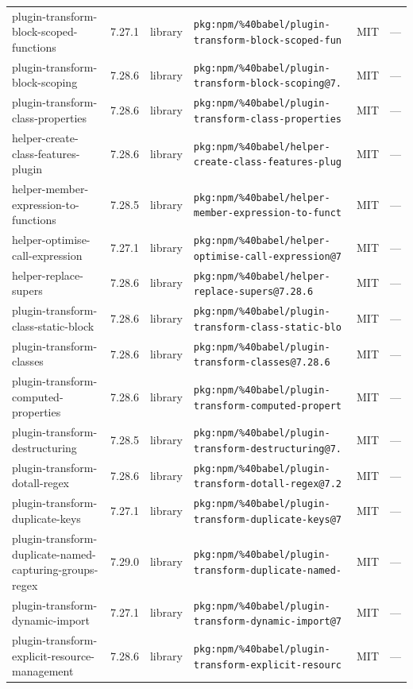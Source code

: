 \documentclass[11pt]{article}
\begin{document}
\begin{longtable}{|l|l|l|p{2.2cm}|l|p{4cm}|}
plugin-transform-block-scoped-functions & 7.27.1 & library & \texttt{pkg:npm/\%40babel/plugin-transform-block-scoped-fun} & MIT & — \\
plugin-transform-block-scoping & 7.28.6 & library & \texttt{pkg:npm/\%40babel/plugin-transform-block-scoping@7.} & MIT & — \\
plugin-transform-class-properties & 7.28.6 & library & \texttt{pkg:npm/\%40babel/plugin-transform-class-properties} & MIT & — \\
helper-create-class-features-plugin & 7.28.6 & library & \texttt{pkg:npm/\%40babel/helper-create-class-features-plug} & MIT & — \\
helper-member-expression-to-functions & 7.28.5 & library & \texttt{pkg:npm/\%40babel/helper-member-expression-to-funct} & MIT & — \\
helper-optimise-call-expression & 7.27.1 & library & \texttt{pkg:npm/\%40babel/helper-optimise-call-expression@7} & MIT & — \\
helper-replace-supers & 7.28.6 & library & \texttt{pkg:npm/\%40babel/helper-replace-supers@7.28.6} & MIT & — \\
plugin-transform-class-static-block & 7.28.6 & library & \texttt{pkg:npm/\%40babel/plugin-transform-class-static-blo} & MIT & — \\
plugin-transform-classes & 7.28.6 & library & \texttt{pkg:npm/\%40babel/plugin-transform-classes@7.28.6} & MIT & — \\
plugin-transform-computed-properties & 7.28.6 & library & \texttt{pkg:npm/\%40babel/plugin-transform-computed-propert} & MIT & — \\
plugin-transform-destructuring & 7.28.5 & library & \texttt{pkg:npm/\%40babel/plugin-transform-destructuring@7.} & MIT & — \\
plugin-transform-dotall-regex & 7.28.6 & library & \texttt{pkg:npm/\%40babel/plugin-transform-dotall-regex@7.2} & MIT & — \\
plugin-transform-duplicate-keys & 7.27.1 & library & \texttt{pkg:npm/\%40babel/plugin-transform-duplicate-keys@7} & MIT & — \\
plugin-transform-duplicate-named-capturing-groups-regex & 7.29.0 & library & \texttt{pkg:npm/\%40babel/plugin-transform-duplicate-named-} & MIT & — \\
plugin-transform-dynamic-import & 7.27.1 & library & \texttt{pkg:npm/\%40babel/plugin-transform-dynamic-import@7} & MIT & — \\
plugin-transform-explicit-resource-management & 7.28.6 & library & \texttt{pkg:npm/\%40babel/plugin-transform-explicit-resourc} & MIT & — \\

\end{longtable}
\end{document}
